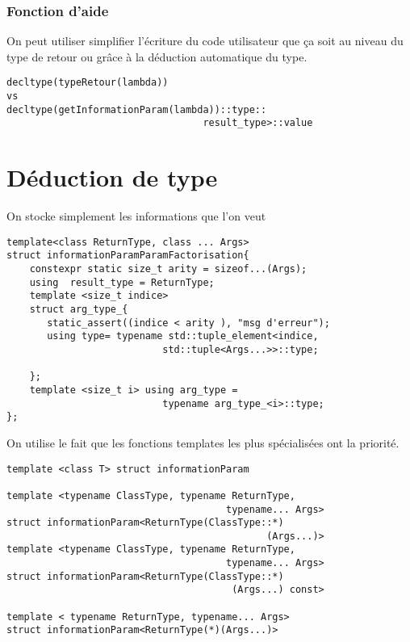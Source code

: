 \documentclass{beamer}
\begin{document}
\begin{frame}[containsverbatim]
	\frametitle{Fonction d'aide}
	On peut utiliser simplifier l’écriture du code utilisateur que ça soit au niveau du type de retour ou grâce à la déduction automatique du type.
	\begin{lstlisting}
decltype(typeRetour(lambda))
vs
decltype(getInformationParam(lambda))::type::
                                  result_type>::value
	\end{lstlisting}

\end{frame}
\section{Déduction de type}
\begin{frame}[containsverbatim]
On stocke simplement les informations que l'on veut
\begin{lstlisting}
template<class ReturnType, class ... Args>
struct informationParamParamFactorisation{
    constexpr static size_t arity = sizeof...(Args);
    using  result_type = ReturnType;
    template <size_t indice>
    struct arg_type_{
       static_assert((indice < arity ), "msg d'erreur");
       using type= typename std::tuple_element<indice,
                           std::tuple<Args...>>::type;

    };
    template <size_t i> using arg_type = 
                           typename arg_type_<i>::type;
};
\end{lstlisting}
\end{frame}
\begin{frame}[containsverbatim]
On utilise le fait que les fonctions templates les plus spécialisées ont la priorité.
\begin{lstlisting}
template <class T> struct informationParam 

template <typename ClassType, typename ReturnType,
                                      typename... Args>
struct informationParam<ReturnType(ClassType::*)
                                             (Args...)>
template <typename ClassType, typename ReturnType,
                                      typename... Args>
struct informationParam<ReturnType(ClassType::*)
                                       (Args...) const>

template < typename ReturnType, typename... Args>
struct informationParam<ReturnType(*)(Args...)>
\end{lstlisting}

\end{frame} 
\end{document}
